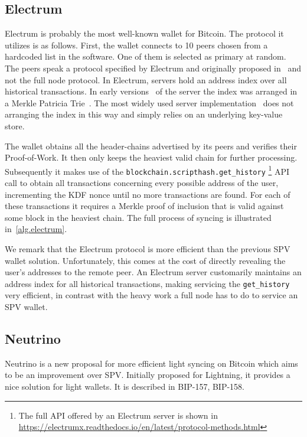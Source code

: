 \subsection{Electrum}
Electrum is probably the most well-known wallet for Bitcoin.
The protocol it utilizes is as follows. First, the wallet connects to 10 peers chosen from a hardcoded list in the software. One of them is selected as primary at random. The peers speak a protocol specified by Electrum and originally proposed in~\cite{stratum} and not the full node protocol.
In Electrum, servers hold an address index over all historical transactions. In early versions~\cite{electrumserver} of the server the index was arranged in a Merkle Patricia Trie~\cite{ultimate}. The most widely used server implementation~\cite{electrumserverrust} does not arranging the index in this way and simply relies on an underlying key-value store.

The wallet obtains all the header-chains advertised by its peers and verifies their Proof-of-Work. It then only keeps the heaviest valid chain for further processing. Subsequently it makes use of the \texttt{block\-chain.\allowbreak script\-hash.\allowbreak get\_history}
\footnote{The full API offered by an Electrum server is shown in \url{https://electrumx.readthedocs.io/en/latest/protocol-methods.html}}
API call to obtain all transactions concerning every possible address of the user, incrementing the KDF nonce until no more transactions are found. For each of these transactions it requires a Merkle proof of inclusion that is valid against some block in the heaviest chain. The full process of syncing is illustrated in~\cref{alg.electrum}.

We remark that the Electrum protocol is more efficient than the previous SPV wallet solution. Unfortunately, this comes at the cost of directly revealing the user's addresses to the remote peer. An Electrum server customarily maintains an address index for all historical transactions, making servicing the \texttt{get\_history} very efficient, in contrast with the heavy work a full node has to do to service an SPV wallet.



\subsection{Neutrino}
Neutrino is a new proposal for more efficient light syncing on Bitcoin which aims to be an improvement over SPV. Initially proposed for Lightning, it provides a nice solution for light wallets. It is described in BIP-157, BIP-158.

